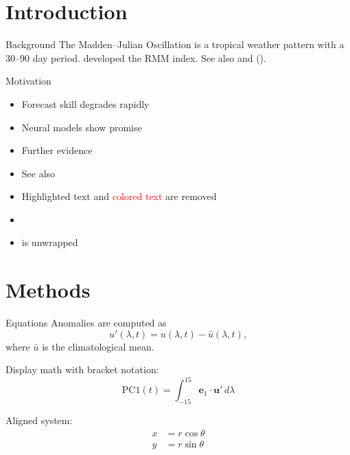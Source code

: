\documentclass{beamer}
\begin{document}
\section{Introduction}

\begin{frame}{Background}
The Madden--Julian Oscillation \citep{madden1971} is a tropical weather
pattern with a 30--90 day period. \citet{wheeler2004} developed the RMM
index. See also \citealp{zhang2005} and \citeauthor{lau2012}
(\citeyear{lau2012}).
\end{frame}

\begin{frame}[allowframebreaks]{Motivation}
\begin{itemize}
  \item Forecast skill degrades rapidly \citep[e.g.,]{vitart2017}
  \item Neural models show promise \citet[see][their Fig.~3]{smith2020}
  \item Further evidence \citet[][p.~5]{jones2019}
  \item See also \citep[cf.][Table~2]{brown2021}
  \item \alert{Highlighted text} and \textcolor{red}{colored text} are removed

  \framebreak

  \item {}
  \item {} is unwrapped
\end{itemize}
\end{frame}

\section{Methods}

\begin{frame}{Equations}
Anomalies are computed as
\begin{equation}
  u'(\lambda, t) = u(\lambda, t) - \bar{u}(\lambda, t),
  \label{eq:anomaly}
\end{equation}
where $\bar{u}$ is the climatological mean.\pause

Display math with bracket notation:
\[
  \mathrm{PC1}(t) = \int_{-15}^{15} \bm{e}_1 \cdot \bm{u}'\,d\lambda
\]

Aligned system:
\begin{align}
  x &= r\cos\theta \label{eq:x}\\
  y &= r\sin\theta \label{eq:y}
\end{align}
\end{frame}
\end{document}
